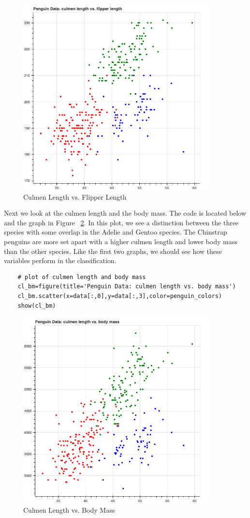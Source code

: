 \documentclass[12pt]{article}
\begin{document}
\begin{figure}[H]
    \centering
    \includegraphics[width=4in]{Figures/penguins/cl_fl.png}
    \caption{Culmen Length vs. Flipper Length}
    \label{fig_cl_fl}
\end{figure}

Next we look at the culmen length and the body mass. The code is located below and the graph in Figure ~\ref{fig_cl_bm}. In this plot, we see a distinction between the three species with some overlap in the Adelie and Gentoo species. The Chinstrap penguins are more set apart with a higher culmen length and lower body mass than the other species. Like the first two graphs, we should see how these variables perform in the classification.

\begin{verbatim}
    # plot of culmen length and body mass
    cl_bm=figure(title='Penguin Data: culmen length vs. body mass')
    cl_bm.scatter(x=data[:,0],y=data[:,3],color=penguin_colors)
    show(cl_bm)
\end{verbatim}

\begin{figure}[H]
    \centering
    \includegraphics[width=4in]{Figures/penguins/cl_bm.png}
    \caption{Culmen Length vs. Body Mass}
    \label{fig_cl_bm}
\end{figure}
\end{document}
